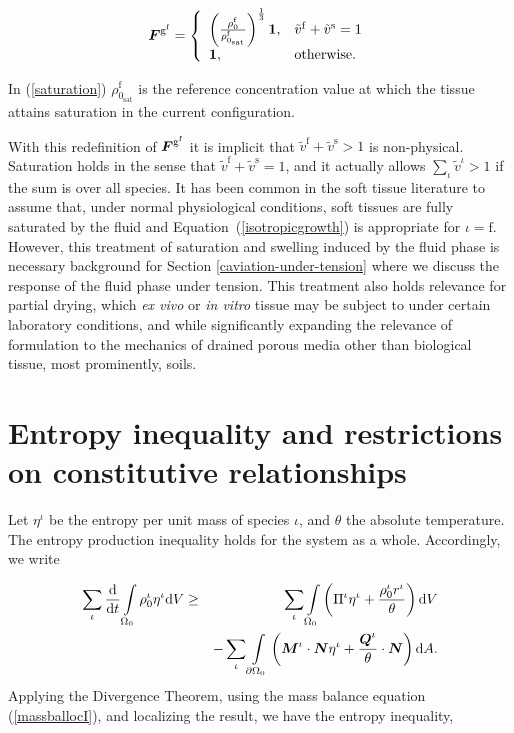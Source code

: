 \begin{equation}
\mbox{\boldmath$ F$}^{\mathrm{g}^\mathrm{f}} = \left\{ \begin{array}{ll} \left(
  \frac{\rho_0^\mathrm{f}}{\rho_{0_{\mathrm{sat}}}^\mathrm{f}}
  \right)^ {\frac{1}{3}}{\bf 1},& \tilde{v}^\mathrm{f} +
  \tilde{v}^\mathrm{s} = 1 \\ {\bf 1},& \mathrm{otherwise.}
\end{array}\right.
\label{saturation}
\end{equation}

\noindent In (\ref{saturation}) $\rho_{0_{\mathrm{sat}}}^\mathrm{f}$
is the reference concentration value at which the tissue attains
saturation in the current configuration.

With this redefinition of $\mbox{\boldmath$ F$}^{\mathrm{g}^\mathrm{f}}$ it is implicit
that $\tilde{v}^\mathrm{f} + \tilde{v}^\mathrm{s} > 1$ is
non-physical. Saturation holds in the sense that $\tilde{v}^\mathrm{f}
+ \tilde{v}^\mathrm{s} = 1$, and it actually allows $\sum_\iota
\tilde{v}^\iota > 1$ if the sum is over all species. It has been
common in the soft tissue literature to assume that, under normal
physiological conditions, soft tissues are fully saturated by the
fluid and \mbox{Equation~(\ref{isotropicgrowth})} is appropriate for
$\iota = \mathrm{f}$. However, this treatment of saturation and
swelling induced by the fluid phase is necessary background for
Section \ref{caviation-under-tension} where we discuss the response of
the fluid phase under tension. This treatment also holds relevance for
partial drying, which \emph{ex vivo} or \emph{in vitro} tissue may be
subject to under certain laboratory conditions, and while
significantly expanding the relevance of formulation to the mechanics
of drained porous media other than biological tissue, most
prominently, soils.

\section{Entropy inequality and restrictions on constitutive
  relationships}
\label{entropy-inequality}

Let $\eta^\iota$ be the entropy per unit mass of species $\iota$,
and $\theta$ the absolute temperature. The entropy production
inequality holds for the system as a whole. Accordingly, we write

\begin{eqnarray}
\sum\limits_{\iota}\frac{\mathrm{d}}{\mathrm{d}t}
\int\limits_{\Omega_0} \rho_0^\iota \eta^\iota \mathrm{d}V &\geq&
\sum\limits_{\iota}\int\limits_{\Omega_0}\left(
\Pi^\iota \eta^\iota + \frac{\rho_0^\iota r^\iota}{\theta}\right)
\mathrm{d}V\nonumber\\ 
& & - \sum\limits_{\iota}\int\limits_{\partial \Omega_0}
\left(\mbox{\boldmath$ M$}^\iota \cdot \mbox{\boldmath$ N$}\eta^\iota + \frac{\mbox{\boldmath$ Q$}^\iota}{\theta}
\cdot \mbox{\boldmath$ N$} \right)\mathrm{d}A.
\end{eqnarray}
\noindent Applying the Divergence Theorem, using the mass balance
equation (\ref{massballocI}), and localizing the result, we have
the entropy inequality,

